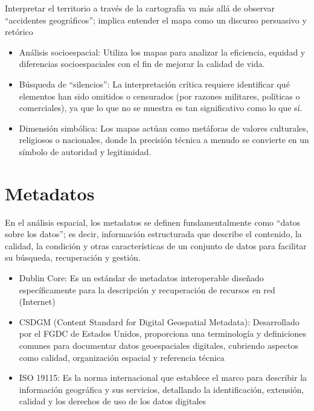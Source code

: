\documentclass[
  letterpaper,
  DIV=11,
  numbers=noendperiod]{scrreprt}
\providecommand{\tightlist}{%
  \setlength{\itemsep}{0pt}\setlength{\parskip}{0pt}}\usepackage{longtable,booktabs,array}
\begin{document}
Interpretar el territorio a través de la cartografía va más allá de
observar ``accidentes geográficos''; implica entender el mapa como un
discurso persuasivo y retórico

\begin{itemize}
\tightlist
\item
  Análisis socioespacial: Utiliza los mapas para analizar la eficiencia,
  equidad y diferencias socioespaciales con el fin de mejorar la calidad
  de vida.
\item
  Búsqueda de ``silencios'': La interpretación crítica requiere
  identificar qué elementos han sido omitidos o censurados (por razones
  militares, políticas o comerciales), ya que lo que no se muestra es
  tan significativo como lo que sí.
\item
  Dimensión simbólica: Los mapas actúan como metáforas de valores
  culturales, religiosos o nacionales, donde la precisión técnica a
  menudo se convierte en un símbolo de autoridad y legitimidad.
\end{itemize}

\section{Metadatos}\label{metadatos}

En el análisis espacial, los metadatos se definen fundamentalmente como
``datos sobre los datos''; es decir, información estructurada que
describe el contenido, la calidad, la condición y otras características
de un conjunto de datos para facilitar su búsqueda, recuperación y
gestión.

\begin{itemize}
\tightlist
\item
  Dublin Core: Es un estándar de metadatos interoperable diseñado
  específicamente para la descripción y recuperación de recursos en red
  (Internet)
\item
  CSDGM (Content Standard for Digital Geospatial Metadata): Desarrollado
  por el FGDC de Estados Unidos, proporciona una terminología y
  definiciones comunes para documentar datos geoespaciales digitales,
  cubriendo aspectos como calidad, organización espacial y referencia
  técnica
\item
  ISO 19115: Es la norma internacional que establece el marco para
  describir la información geográfica y sus servicios, detallando la
  identificación, extensión, calidad y los derechos de uso de los datos
  digitales
\end{itemize}
\end{document}
